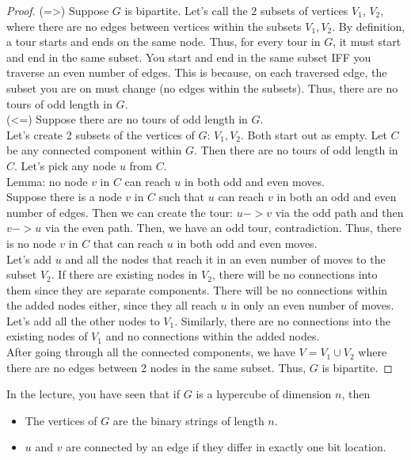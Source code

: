 \documentclass[11pt]{article}
\begin{document}
\begin{solution}
\begin{Parts}
\Part \begin{proof}
(=>) Suppose $G$ is bipartite. Let's call the 2 subsets of vertices $V_1$, $V_2$,
where there are no edges between vertices within the subsets $V_1,V_2$.
By definition, a tour starts and ends on the same node. 
Thus, for every tour in $G$, it must start and end in the same subset.
You start and end in the same subset IFF you traverse an even number of edges.
This is because, on each traversed edge, the subset you are on must change (no edges within the subsets).
Thus, there are no tours of odd length in $G$.
\\(<=) Suppose there are no tours of odd length in $G$.
\\Let's create 2 subsets of the vertices of $G$: $V_1,V_2$. Both start out as empty.
Let $C$ be any connected component within $G$.
Then there are no tours of odd length in $C$.
Let's pick any node $u$ from $C$.
\\Lemma: no node $v$ in $C$ can reach $u$ in both odd and even moves.
\\Suppose there is a node $v$ in $C$ such that $u$ can reach $v$ in both an odd and even number of edges.
Then we can create the tour: $u->v$ via the odd path and then $v->u$ via the even path.
Then, we have an odd tour, contradiction.
Thus, there is no node $v$ in $C$ that can reach $u$ in both odd and even moves.
\\Let's add $u$ and all the nodes that reach it in an even number of moves to the subset $V_2$.
If there are existing nodes in $V_2$, there will be no connections into them since they are separate components.
There will be no connections within the added nodes either, since they all reach $u$ in only an even number of moves.
\\Let's add all the other nodes to $V_1$. 
Similarly, there are no connections into the existing nodes of $V_1$
and no connections within the added nodes.
\\After going through all the connected components, we have $V=V_1\cup V_2$ where there are no edges between 2 nodes in the same subset.
Thus, $G$ is bipartite.
\end{proof}\end{Parts}\end{solution}\newpage


In the lecture, you have seen that if $G$ is a hypercube of dimension $n$, then
\begin{itemize}
    \item The vertices of $G$ are the binary strings of length $n$.
    \item $u$ and $v$ are connected by an edge if they differ in exactly one bit location.
\end{itemize}
\end{document}
